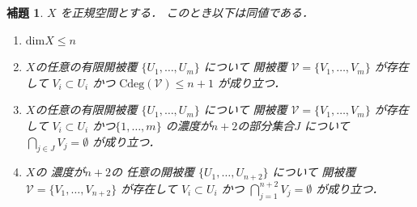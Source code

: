 \documentclass[leqno, a4paper, 12pt]{jsarticle}
\newtheorem{lem}[thm]{補題}
\newcommand{\yodim}{\mathrm{dim}}
\newcommand{\yodeg}{\mathrm{Cdeg}}
\numberwithin{equation}{section}
\begin{document}
\begin{lem}\label{lem:hihukudim}
$X$
を正規空間とする．
このとき以下は同値である．
\begin{enumerate}[label=\textup{(\arabic*)}]
\item\label{item:lem:dimn} 
$\yodim X\le n$
\item\label{item:lem:degn+2} 

$X$の任意の有限開被覆
$\{U_{1}, \dots, U_{m}\}$
について
開被覆
$\mathcal{V}=\{V_{1}, \dots, V_{m}\}$
が存在して
$V_{i}\subset U_{i}$
かつ
$\yodeg(\mathcal{V})\le n+1$
が成り立つ．
\item\label{item:lem:n+20} 
$X$の任意の有限開被覆
$\{U_{1}, \dots, U_{m}\}$
について
開被覆
$\mathcal{V}=\{V_{1}, \dots, V_{m}\}$
が存在して
$V_{i}\subset U_{i}$
かつ$\{1, \dots, m\}$
の濃度が$n+2$の部分集合$J$
について
$\bigcap_{j\in J}V_{j}=\emptyset$
が成り立つ．
\item\label{item:lem:n+2n+2} 
$X$の
濃度が$n+2$の
任意の開被覆
$\{U_{1}, \dots, U_{n+2}\}$
について
開被覆
$\mathcal{V}=\{V_{1}, \dots, V_{n+2}\}$
が存在して
$V_{i}\subset U_{i}$
かつ
$\bigcap_{j=1}^{n+2}V_{j}=\emptyset$
が成り立つ．
\end{enumerate}
\end{lem}
\end{document}
